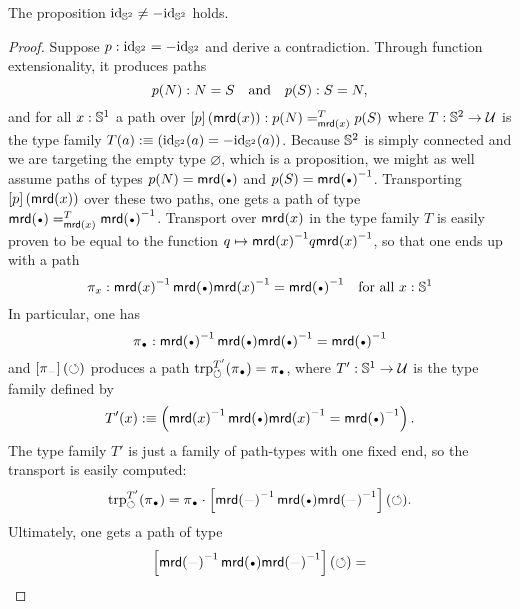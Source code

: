 \documentclass[english,a4]{article}
\renewcommand{\ap}[1]{\left[{#1}\right]}
\begin{document}
\begin{lemma}
  \label{lemma:S2-id-neq-minusid}%
  The proposition $\mathord{\mathrm{id}}_{{\mathbb S^{2}}} \neq -\mathord{\mathrm{id}}_{{\mathbb S^{2}}}$ holds.
\end{lemma}
\begin{proof}
  Suppose $p:\mathord{\mathrm{id}}_{{\mathbb S^{2}}} = -\mathord{\mathrm{id}}_{{\mathbb S^{2}}}$ and derive a contradiction. Through
  function extensionality, it produces paths
  \begin{displaymath}
    p(N) : N = S
    \quad\text{and}\quad
    p(S) : S = N,
  \end{displaymath}
  and for all $x:{{\mathbb S^{1}}}$ a path over
  $\ap p (\mrd(x))\from \pathover {p(N)} T {\mrd(x)} {p(S)}$ where
  $T: {{\mathbb S^{2}}} \to \mathcal{U}$ is the type family
  $T(a)\mathrel{\hbox{:}\mkern-5mu\equiv} (\mathord{\mathrm{id}}_{{\mathbb S^{2}}}(a) = -\mathord{\mathrm{id}}_{{\mathbb S^{2}}}(a))$. Because ${{\mathbb S^{2}}}$ is simply
  connected and we are targeting the empty type $\varnothing$, which
  is a proposition, we might as well assume paths of types $p(N)=\mrd(\base)$
  and $p(S) = \inv{\mrd(\base)}$. Transporting $\ap p(\mrd(x))$ over
  these two paths, one gets a path of type
  $\pathover {\mrd(\base)} T {\mrd(x)} {\inv{\mrd(\base)}}$. 
  Transport over $\operatorname{\mathsf{mrd}}(x)$ in the type family $T$ is
  easily proven to be equal to the function
  $q \mapsto {\operatorname{\mathsf{mrd}}(x)}^{-1} q {\operatorname{\mathsf{mrd}}(x)}^{-1}$, so that one
  ends up with a path
  \begin{displaymath}
    \pi_x\from \inv{\mrd(x)} \mrd(\base) \inv{\mrd(x)} = \inv{\mrd(\base)}
    \quad
    \text{for all }x\from\Sc
  \end{displaymath}
  In particular, one has
  \begin{displaymath}
    \pi_{\base} \from \inv{\mrd(\base)} \mrd(\base) \inv{\mrd(\base)}
    = \inv{\mrd(\base)}
  \end{displaymath}
  and $\ap {\pi_{\blank}} (\Sloop)$ produces a path
  $\trp [T'] \Sloop (\pi_{\base}) = \pi_{\base}$, where $T':{{\mathbb S^{1}}}\to\mathcal{U}$
  is the type family defined by
  \begin{displaymath}
    T'(x) \defequi \left(\inv{\mrd(x)}\mrd(\base)\inv{\mrd(x)}
      = \inv{\mrd(\base)} \right).
  \end{displaymath}
  The type family $T'$ is just a family of path-types with one fixed
  end, so the transport is easily computed:
  \begin{displaymath}
    \trp [T'] \Sloop (\pi_{\base}) = \pi_{\base} \cdot
    \ap{\inv{\mrd(\blank)} \mrd(\base) \inv{\mrd(\blank)}}(\Sloop).
  \end{displaymath}
  Ultimately, one gets a path of type
  \begin{displaymath}
    \ap{\inv{\mrd(\blank)} \mrd(\base) \inv{\mrd(\blank)}}(\Sloop) =

\end{displaymath}
\end{proof}
\end{document}
